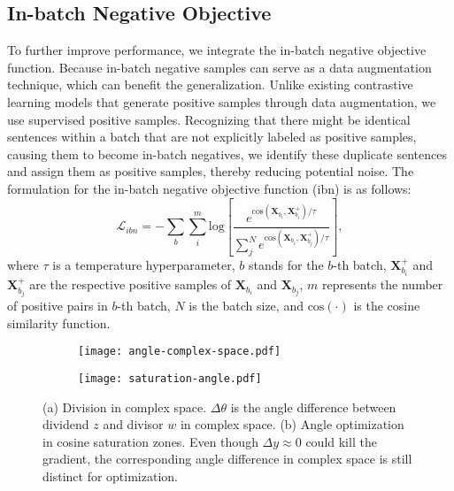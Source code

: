 \documentclass{article} \usepackage{iclr2024_conference,times}
\begin{document}
\subsection{In-batch Negative Objective}
To further improve performance, we integrate the in-batch negative objective function. Because in-batch negative samples can serve as a data augmentation technique, which can benefit the generalization. Unlike existing contrastive learning models \citep{simcse_gao_2021,consert_yan_2021} that generate positive samples through data augmentation, we use supervised positive samples. Recognizing that there might be identical sentences within a batch that are not explicitly labeled as positive samples, causing them to become in-batch negatives, we identify these duplicate sentences and assign them as positive samples, thereby reducing potential noise. 
The formulation for the in-batch negative objective function (ibn) is as follows:
\begin{equation}
    \mathcal{L}_{ibn} = - \sum_b \sum_i^m \mathrm{log} \left [ \frac{e^{\mathrm{cos}(\mathbf{X}_{b_i}, \mathbf{X}_{b_i}^+) / \tau}}{\sum_j^N e^{\mathrm{cos}(\mathbf{X}_{b_i}, \mathbf{X}_{b_j}^+) / \tau}} \right ],
\end{equation}
where $\tau$ is a temperature hyperparameter, $b$ stands for the $b$-th batch, $\mathbf{X}_{b_i}^+$ and $\mathbf{X}_{b_j}^+$ are the respective positive samples of $\mathbf{X}_{b_i}$ and $\mathbf{X}_{b_j}$, $m$ represents the number of positive pairs in $b$-th batch, $N$ is the batch size, and $\mathrm{cos}(\cdot)$ is the cosine similarity function.

\begin{figure}[ht]
     \centering
     \begin{subfigure}[b]{0.45\textwidth}
         \centering
         \texttt{[image: angle-complex-space.pdf]}
         \caption{}
         \label{angle-complex-space}
     \end{subfigure}
     \begin{subfigure}[b]{0.45\textwidth}
         \centering
         \texttt{[image: saturation-angle.pdf]}
         \caption{}
         \label{figure-saturation-angle}
     \end{subfigure}
    \caption{(a) Division in complex space. $\Delta \theta$ is the angle difference between dividend $z$ and divisor $w$ in complex space. (b) Angle optimization in cosine saturation zones. Even though $\Delta y \approx 0$ could kill the gradient, the corresponding angle difference in complex space is still distinct for optimization.}
    \label{}
\end{figure}
\end{document}
